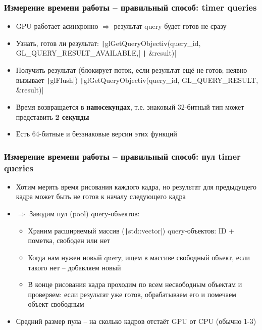 \documentclass{beamer}
\begin{document}
\begin{frame}[fragile]
\frametitle{Измерение времени работы -- правильный способ: timer queries}
\begin{itemize}
\item GPU работает асинхронно \begin{math}\Longrightarrow\end{math} результат query будет готов не сразу
\pause
\item Узнать, готов ли результат:
\texttt|glGetQueryObjectiv(query_id, GL_QUERY_RESULT_AVAILABLE,|
\texttt|    &result)|
\pause
\item Получить результат (блокирует поток, если результат ещё не готов; неявно вызывает \texttt|glFlush|)
\texttt|glGetQueryObjectiv(query_id, GL_QUERY_RESULT, &result)|
\pause
\item Время возвращается в \textbf{наносекундах}, т.е. знаковый 32-битный тип может представить \textbf{2 секунды}
\pause
\item Есть 64-битные и беззнаковые версии этих функций
\end{itemize}
\end{frame}

\begin{frame}[fragile]
\frametitle{Измерение времени работы -- правильный способ: пул timer queries}
\begin{itemize}
\item Хотим мерять время рисования каждого кадра, но результат для предыдущего кадра может быть не готов к началу следующего кадра
\pause
\item \begin{math}\Longrightarrow\end{math} Заводим пул (pool) query-объектов:
\pause
\begin{itemize}
\item Храним расширяемый массив (\texttt|std::vector|) query-объектов: ID + пометка, свободен или нет
\pause
\item Когда нам нужен новый query, ищем в массиве свободный объект, если такого нет -- добавляем новый
\pause
\item В конце рисования кадра проходим по всем несвободным объектам и проверяем: если результат уже готов, обрабатываем его и помечаем объект свободным
\end{itemize}
\pause
\item Средний размер пула -- на сколько кадров отстаёт GPU от CPU (обычно 1-3)
\end{itemize}
\end{frame}
\end{document}

